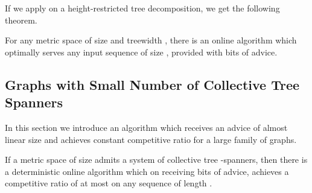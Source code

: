 If we apply \npc on a height-restricted tree decomposition, we get the following theorem.

\begin{theorem}\label{UpperBoundTreeWidth}
 For any metric space of size  and treewidth , there is an online algorithm which optimally serves any input sequence of size , provided with  bits of advice.
\end{theorem}


\subsection{Graphs with Small Number of Collective Tree Spanners}

In this section we introduce an algorithm which receives an advice of almost linear size and achieves constant competitive ratio for a large family of graphs. 



\begin{theorem}\label{thspan}
If a metric space of size  admits a system of  collective tree -spanners, then there is a deterministic online algorithm which on receiving 
 bits of advice, achieves a competitive ratio of at most  on any sequence of length .
\end{theorem}

